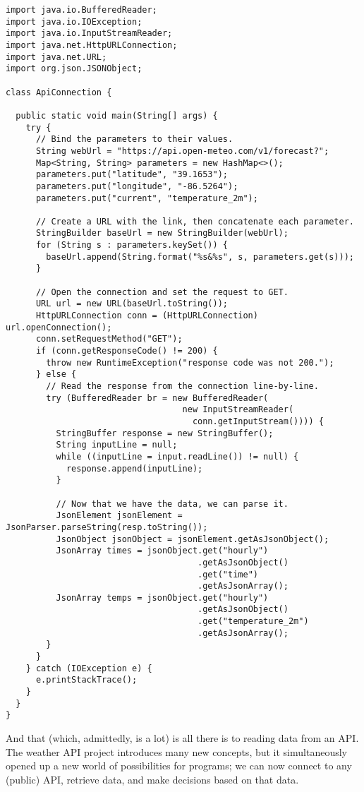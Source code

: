 \newpage %

\begin{lstlisting}[language=MyJava]
import java.io.BufferedReader;
import java.io.IOException;
import java.io.InputStreamReader;
import java.net.HttpURLConnection;
import java.net.URL;
import org.json.JSONObject;

class ApiConnection {

  public static void main(String[] args) {
    try {
      // Bind the parameters to their values.
      String webUrl = "https://api.open-meteo.com/v1/forecast?";
      Map<String, String> parameters = new HashMap<>();
      parameters.put("latitude", "39.1653");
      parameters.put("longitude", "-86.5264");
      parameters.put("current", "temperature_2m");

      // Create a URL with the link, then concatenate each parameter.
      StringBuilder baseUrl = new StringBuilder(webUrl);
      for (String s : parameters.keySet()) { 
        baseUrl.append(String.format("%s&%s", s, parameters.get(s))); 
      }
    
      // Open the connection and set the request to GET.
      URL url = new URL(baseUrl.toString());
      HttpURLConnection conn = (HttpURLConnection) url.openConnection();
      conn.setRequestMethod("GET");
      if (conn.getResponseCode() != 200) {
        throw new RuntimeException("response code was not 200.");
      } else {
        // Read the response from the connection line-by-line.
        try (BufferedReader br = new BufferedReader(
                                   new InputStreamReader(
                                     conn.getInputStream()))) {
          StringBuffer response = new StringBuffer();
          String inputLine = null;
          while ((inputLine = input.readLine()) != null) {
            response.append(inputLine); 
          }

          // Now that we have the data, we can parse it.
          JsonElement jsonElement = JsonParser.parseString(resp.toString());
          JsonObject jsonObject = jsonElement.getAsJsonObject();
          JsonArray times = jsonObject.get("hourly")
                                      .getAsJsonObject()
                                      .get("time")
                                      .getAsJsonArray();
          JsonArray temps = jsonObject.get("hourly")
                                      .getAsJsonObject()
                                      .get("temperature_2m")
                                      .getAsJsonArray();
        }
      }
    } catch (IOException e) {
      e.printStackTrace();
    }
  }
}
\end{lstlisting}

And that (which, admittedly, is a lot) is all there is to reading data from an API. 
The weather API project introduces many new concepts, but it simultaneously opened up a new world of possibilities for programs; we can now connect to any (public) API, retrieve data, and make decisions based on that data.